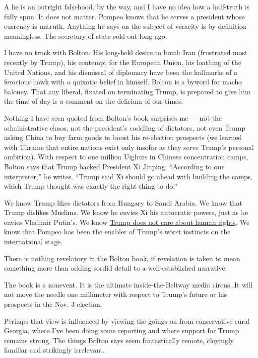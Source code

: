 A lie is an outright falsehood, by the way, and I have no idea how a
half-truth is fully spun. It does not matter. Pompeo knows that he
serves a president whose currency is untruth. Anything he says on the
subject of veracity is by definition meaningless. The secretary of state
sold out long ago.

I have no truck with Bolton. His long-held desire to bomb Iran
(frustrated most recently by Trump), his contempt for the European
Union, his loathing of the United Nations, and his dismissal of
diplomacy have been the hallmarks of a ferocious hawk with a quixotic
belief in himself. Bolton is a byword for macho baloney. That any
liberal, fixated on terminating Trump, is prepared to give him the time
of day is a comment on the delirium of our times.

Nothing I have seen quoted from Bolton's book surprises me --- not the
administrative chaos, not the president's coddling of dictators, not
even Trump asking China to buy farm goods to boost his re-election
prospects (we learned with Ukraine that entire nations exist only
insofar as they serve Trump's personal ambition). With respect to one
million Uighurs in Chinese concentration camps, Bolton says that Trump
backed President Xi Jinping. ``According to our interpreter,'' he
writes. ``Trump said Xi should go ahead with building the camps, which
Trump thought was exactly the right thing to do.''

We know Trump likes dictators from Hungary to Saudi Arabia. We know that
Trump dislikes Muslims. We know he envies Xi his autocratic powers, just
as he envies Vladimir Putin's. We know
\href{https://www.nytimes3xbfgragh.onion/2019/07/12/opinion/trump-pompeo-human-rights.html}{Trump
does not care about human rights}. We know that Pompeo has been the
enabler of Trump's worst instincts on the international stage.

There is nothing revelatory in the Bolton book, if revelation is taken
to mean something more than adding sordid detail to a well-established
narrative.

The book is a nonevent. It is the ultimate inside-the-Beltway media
circus. It will not move the needle one millimeter with respect to
Trump's future or his prospects in the Nov. 3 election.

Perhaps that view is influenced by viewing the goings-on from
conservative rural Georgia, where I've been doing some reporting and
where support for Trump remains strong. The things Bolton says seem
fantastically remote, cloyingly familiar and strikingly irrelevant.

